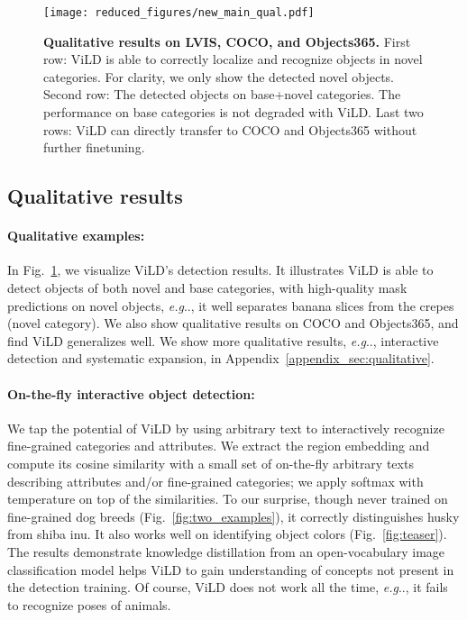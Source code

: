 \documentclass{article} \usepackage{iclr2022_conference,times}
\makeatletter
\DeclareRobustCommand\onedot{\futurelet\@let@token\@onedot}
\def\@onedot{\ifx\@let@token.\else.\null\fi\xspace}
\def\eg{\emph{e.g}\onedot} \def\Eg{\emph{E.g}\onedot}
\makeatother
\begin{document}
\begin{figure}[t]
\centering
   \texttt{[image: reduced\_figures/new\_main\_qual.pdf]}
   \vspace{-1ex}
   \caption{\textbf{Qualitative results on LVIS, COCO, and Objects365.} First row: ViLD is able to correctly localize and recognize objects in novel categories. For clarity, we only show the detected novel objects. Second row: The detected objects on base+novel categories. The performance on base categories is not degraded with ViLD. Last two rows: ViLD can directly transfer to COCO and Objects365 without further finetuning.}\label{fig:main_qual}
\vspace{-2ex}
\end{figure}


\subsection{Qualitative results}
\paragraph{Qualitative examples:} In Fig.~\ref{fig:main_qual}, we visualize ViLD's detection results. It illustrates ViLD is able to detect objects of both novel and base categories, with high-quality mask predictions on novel objects, \eg, it well separates banana slices from the crepes (novel category). We also show qualitative results on COCO and Objects365, and find ViLD generalizes well.
We show more qualitative results, \eg, interactive detection and systematic expansion, in Appendix~\ref{appendix_sec:qualitative}.

\paragraph{On-the-fly interactive object detection:} We tap the potential of ViLD by using arbitrary text to interactively recognize fine-grained categories and attributes.
We extract the region embedding and compute its cosine similarity with a small set of on-the-fly arbitrary texts describing attributes and/or fine-grained categories; we apply softmax with temperature  on top of the similarities. To our surprise, though never trained on fine-grained dog breeds (Fig.~\ref{fig:two_examples}), it correctly distinguishes husky from shiba inu. It also works well on identifying object colors (Fig.~\ref{fig:teaser}). The results demonstrate knowledge distillation from an open-vocabulary image classification model helps ViLD to gain understanding of concepts not present in the detection training. Of course, ViLD does not work all the time, \eg, it fails to recognize poses of animals.
\end{document}
